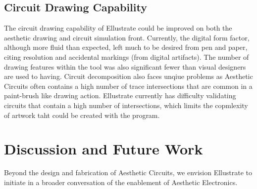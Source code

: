 \documentclass{sigchi}
\begin{document}
\subsection{Circuit Drawing Capability}
The circuit drawing capability of Ellustrate could be improved on both the aesthetic drawing and circuit simulation front. Currently, the digital form factor, although more fluid than expected, left much to be desired from pen and paper, citing resolution and accidental markings (from digital artifacts). The number of drawing features within the tool was also significant fewer than visual designers are used to having. Circuit decomposition also faces unqiue problems as Aesthetic Circuits often contains a high number of trace intersections that are common in a paint-brush like drawing action. Ellustrate currently has difficulty validating circuits that contain a high number of intersections, which limits the copmlexity of artwork taht could be created with the program. 

\newpage
\section {Discussion and Future Work}
Beyond the design and fabrication of Aesthetic Circuits, we envision Ellustrate to initiate in a broader conversation of the enablement of Aesthetic Electronics.


\end{document}
